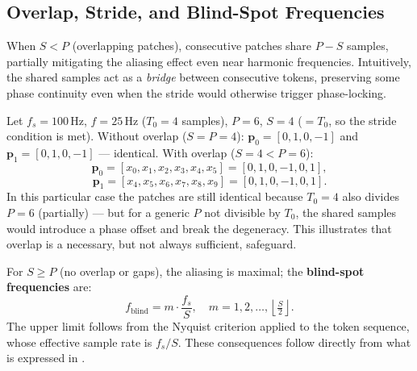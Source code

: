 \subsection{Overlap, Stride, and Blind-Spot Frequencies}

When $S < P$ (overlapping patches), consecutive patches share $P - S$ samples, partially
mitigating the aliasing effect even near harmonic frequencies.
Intuitively, the shared samples act as a \emph{bridge} between consecutive tokens,
preserving some phase continuity even when the stride would otherwise trigger
phase-locking.

\begin{example}
	Let $f_s = 100\,\text{Hz}$, $f = 25\,\text{Hz}$ ($T_0 = 4$ samples), $P = 6$,
	$S = 4$ ($= T_0$, so the stride condition is met).
	Without overlap ($S = P = 4$): $\mathbf{p}_0 = [0,1,0,-1]$ and
	$\mathbf{p}_1 = [0,1,0,-1]$ — identical.
	With overlap ($S = 4 < P = 6$):
	\[
	\mathbf{p}_0 = [x_0,x_1,x_2,x_3,x_4,x_5]
	= [0,1,0,-1,0,1],
	\]
	\[
	\mathbf{p}_1 = [x_4,x_5,x_6,x_7,x_8,x_9]
	= [0,1,0,-1,0,1].
	\]
	In this particular case the patches are still identical because $T_0 = 4$ also
	divides $P = 6$ (partially) — but for a generic $P$ not divisible by $T_0$, the
	shared samples would introduce a phase offset and break the degeneracy.
	This illustrates that overlap is a necessary, but not always sufficient, safeguard.
\end{example}

For $S \geq P$ (no overlap or gaps), the aliasing is maximal; the
\textbf{blind-spot frequencies} are:
\begin{equation}
	\boxed{f_{\mathrm{blind}} = m \cdot \frac{f_s}{S}, \quad
		m = 1, 2, \ldots, \left\lfloor \tfrac{S}{2} \right\rfloor.}
\end{equation}
The upper limit follows from the Nyquist criterion applied to the token sequence, whose
effective sample rate is $f_s/S$.
These consequences follow directly from what is expressed in
\cite{paganiPreliminaryInsightsChronos2026b}.

